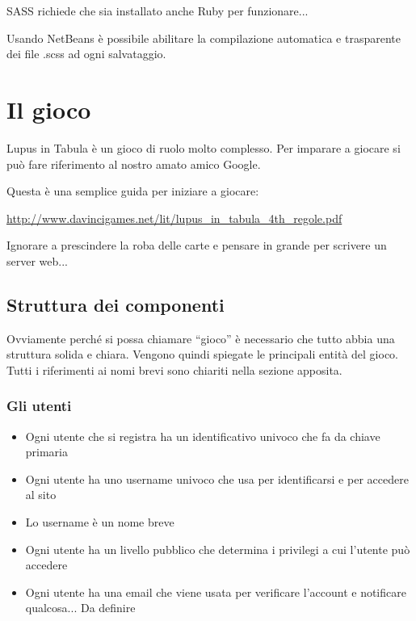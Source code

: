 \documentclass[10pt,a4paper]{article}
\begin{document}
SASS richiede che sia installato anche Ruby per funzionare... 

Usando NetBeans è possibile abilitare la compilazione automatica e trasparente dei file .scss ad ogni salvataggio.

\newpage

\section{Il gioco}
Lupus in Tabula è un gioco di ruolo molto complesso. Per imparare a giocare si può fare riferimento al nostro amato amico Google.

Questa è una semplice guida per iniziare a giocare:

\url{http://www.davincigames.net/lit/lupus_in_tabula_4th_regole.pdf}

Ignorare a prescindere la roba delle carte e pensare in grande per scrivere un server web...

\subsection{Struttura dei componenti}
Ovviamente perché si possa chiamare “gioco” è necessario che tutto abbia una struttura solida e chiara. Vengono quindi spiegate le principali entità del gioco. Tutti i riferimenti ai nomi brevi sono chiariti nella sezione apposita.

\subsubsection{Gli utenti}
\begin{itemize}
\item Ogni utente che si registra ha un identificativo univoco che fa da chiave primaria
\item Ogni utente ha uno \textsf{username} univoco che usa per identificarsi e per accedere al sito
\item Lo \textsf{username} è un nome breve
\item Ogni utente ha un livello pubblico che determina i privilegi a cui l'utente può accedere
\item Ogni utente ha una email che viene usata per verificare l'account e notificare qualcosa... Da definire
\end{itemize}
\end{document}
